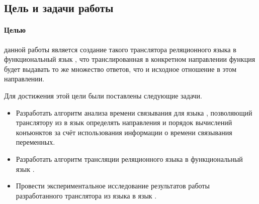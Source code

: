 \subsection{Цель и задачи работы}
\label{goals}

\paragraph{Целью} данной работы является создание такого транслятора реляционного языка \miniKanren{} в функциональный язык \haskell{}, что транслированная в конкретном направлении функция будет выдавать то же множество ответов, что и исходное отношение в этом направлении.

Для достижения этой цели были поставлены следующие задачи.

\begin{itemize}
    \item Разработать алгоритм анализа времени связывания для языка \miniKanren{}, позволяющий транслятору из \miniKanren{} в язык \haskell{} определять направления и порядок вычислений конъюнктов за счёт использования информации о времени связывания переменных.
    
    \item Разработать алгоритм трансляции реляционного языка \miniKanren{} в функциональный язык \haskell{}.
    
    \item Провести экспериментальное исследование результатов работы разработанного транслятора из языка \miniKanren{} в язык \haskell{}.

\end{itemize}
